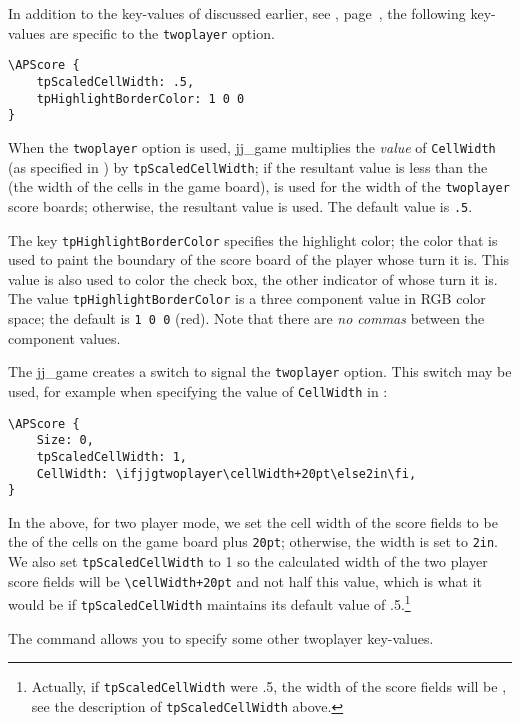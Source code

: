 \documentclass{article}
\begin{document}
In addition to the key-values of  discussed earlier, see
, page~\pageref*{gamedesign},
the following key-values are specific to the \texttt{twoplayer} option.
\begin{Verbatim}[xleftmargin=\amtIndent,fontsize=\small]
\APScore {
    tpScaledCellWidth: .5,
    tpHighlightBorderColor: 1 0 0
}
\end{Verbatim}
When the \texttt{twoplayer} option is used, \textsf{jj\_game} multiplies the \emph{value} of \texttt{CellWidth}
(as specified in ) by \texttt{tpScaledCellWidth}; if the resultant value is less than the 
(the width of the cells in the game board),  is used for the width of the \texttt{twoplayer} score boards;
otherwise, the resultant value is used. The default value is \texttt{.5}.

The key \texttt{tpHighlightBorderColor} specifies the highlight color; the color that is used to paint the boundary
of the score board of the player whose turn it is. This value is also used to color the check box, the other indicator
of whose turn it is. The value \texttt{tpHighlightBorderColor} is a three component value in RGB color space; the
default is \texttt{1 0 0} (red). Note that there are \emph{no commas} between the component values.

The \textsf{jj\_game} creates a switch  to signal the \texttt{twoplayer} option. This switch may
be used, for example when specifying the value of \texttt{CellWidth} in :

\begin{Verbatim}[xleftmargin=\amtIndent,fontsize=\small]
\APScore {
    Size: 0,
    tpScaledCellWidth: 1,
    CellWidth: \ifjjgtwoplayer\cellWidth+20pt\else2in\fi,
}
\end{Verbatim}
In the above, for two player mode, we set the cell width of the score fields to be the 
of the cells on the game board plus \texttt{20pt}; otherwise, the width is set to \texttt{2in}.
We also set \texttt{tpScaledCellWidth} to 1 so the calculated width of the two player score fields
will be \verb!\cellWidth+20pt! and not half this value, which is what it would be if
\texttt{tpScaledCellWidth} maintains its default value of .5.\footnote{Actually, if \texttt{tpScaledCellWidth}
were .5, the width of the score fields will be , see the description of
\texttt{tpScaledCellWidth} above.}

\newtopic The  command allows you to specify some other twoplayer key-values.
\end{document}
